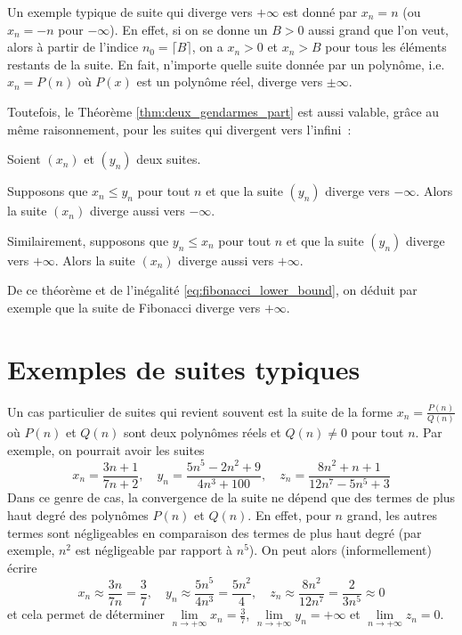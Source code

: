 Un exemple typique de suite qui diverge vers $+\infty$ est donné par $x_n = n$ (ou $x_n = -n$ pour $-\infty$). En effet, si on se donne un $B > 0$ aussi grand que l'on veut, alors à partir de l'indice $n_0 = \lceil B \rceil$, on a $x_n > 0$ et $x_n > B$ pour tous les éléments restants de la suite. En fait, n'importe quelle suite donnée par un polynôme, i.e. $x_n = P(n)$ où $P(x)$ est un polynôme réel, diverge vers $\pm \infty$.

Toutefois, le Théorème \ref{thm:deux_gendarmes_part} est aussi valable, grâce au même raisonnement, pour les suites qui divergent vers l'infini~:

\begin{boxthm}\label{thm:un_gendarme}
Soient $(x_n)$ et $(y_n)$ deux suites. 

Supposons que $x_n \leq y_n$ pour tout $n$ et que la suite $(y_n)$ diverge vers $-\infty$. Alors la suite $(x_n)$ diverge aussi vers $-\infty$.

Similairement, supposons que $y_n \leq x_n$ pour tout $n$ et que la suite $(y_n)$ diverge vers $+\infty$. Alors la suite $(x_n)$ diverge aussi vers $+\infty$.
\end{boxthm}
De ce théorème et de l'inégalité \ref{eq:fibonacci_lower_bound}, on déduit par exemple que la suite de Fibonacci diverge vers $+\infty$.

\section{Exemples de suites typiques}
Un cas particulier de suites qui revient souvent est la suite de la forme $x_n = \frac{P(n)}{Q(n)}$ où $P(n)$ et $Q(n)$ sont deux polynômes réels et $Q(n) \neq 0$ pour tout $n$. Par exemple, on pourrait avoir les suites
$$x_n = \frac{3n+1}{7n+2}, \quad y_n = \frac{5n^5 - 2n^2 + 9}{4n^3 + 100}, \quad z_n = \frac{8n^2 + n + 1}{12n^7 - 5n^5 + 3}$$
Dans ce genre de cas, la convergence de la suite ne dépend que des termes de plus haut degré des polynômes $P(n)$ et $Q(n)$. En effet, pour $n$ grand, les autres termes sont négligeables en comparaison des termes de plus haut degré (par exemple, $n^2$ est négligeable par rapport à $n^5$). On peut alors (informellement) écrire
$$x_n \approx \frac{3n}{7n} = \frac{3}{7}, \quad y_n \approx \frac{5n^5}{4n^3} = \frac{5n^2}{4}, \quad z_n \approx \frac{8n^2}{12n^7} = \frac{2}{3n^5} \approx 0$$
et cela permet de déterminer $\lim \limits_{n \to +\infty}x_n = \frac{3}{7}$, $\lim \limits_{n \to +\infty}y_n = +\infty$ et $\lim \limits_{n \to +\infty} z_n = 0$.

